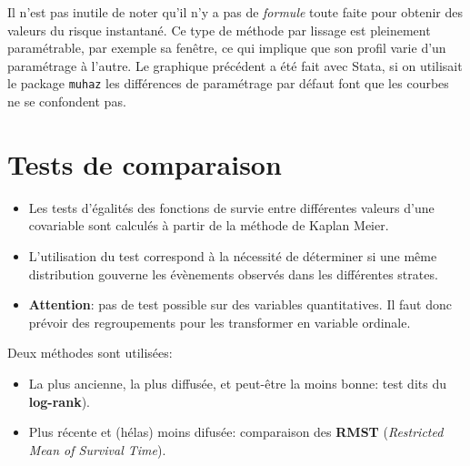 \documentclass[
  12pt,
  letterpaper,
  DIV=11,
  numbers=noendperiod,
  onepage,
  openany]{scrreprt}
\providecommand{\tightlist}{%
  \setlength{\itemsep}{0pt}\setlength{\parskip}{0pt}}\usepackage{longtable,booktabs,array}
\begin{document}
\begin{tcolorbox}[enhanced jigsaw, arc=.35mm, bottomrule=.15mm, titlerule=0mm, colbacktitle=quarto-callout-note-color!10!white, left=2mm, opacitybacktitle=0.6, toprule=.15mm, title=\textcolor{quarto-callout-note-color}{\faInfo}\hspace{0.5em}{Note}, colframe=quarto-callout-note-color-frame, breakable, coltitle=black, opacityback=0, toptitle=1mm, bottomtitle=1mm, rightrule=.15mm, leftrule=.75mm, colback=white]

Il n'est pas inutile de noter qu'il n'y a pas de \emph{formule} toute
faite pour obtenir des valeurs du risque instantané. Ce type de méthode
par lissage est pleinement paramétrable, par exemple sa fenêtre, ce qui
implique que son profil varie d'un paramétrage à l'autre. Le graphique
précédent a été fait avec Stata, si on utilisait le package
\texttt{muhaz} les différences de paramétrage par défaut font que les
courbes ne se confondent pas.

\end{tcolorbox}

\hypertarget{tests-de-comparaison}{%
\chapter{\texorpdfstring{\textbf{Tests de
comparaison}}{Tests de comparaison}}\label{tests-de-comparaison}}

\begin{itemize}
\tightlist
\item
  Les tests d'égalités des fonctions de survie entre différentes valeurs
  d'une covariable sont calculés à partir de la méthode de Kaplan Meier.
\item
  L'utilisation du test correspond à la nécessité de déterminer si une
  même distribution gouverne les évènements observés dans les
  différentes strates.\\
\item
  \textbf{Attention}: pas de test possible sur des variables
  quantitatives. Il faut donc prévoir des regroupements pour les
  transformer en variable ordinale.
\end{itemize}

Deux méthodes sont utilisées:

\begin{itemize}
\tightlist
\item
  La plus ancienne, la plus diffusée, et peut-être la moins bonne: test
  dits du \textbf{log-rank}).
\item
  Plus récente et (hélas) moins difusée: comparaison des \textbf{RMST}
  (\emph{Restricted Mean of Survival Time}).
\end{itemize}
\end{document}
